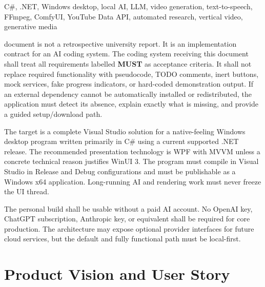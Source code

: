 \documentclass[10pt,journal,compsoc]{IEEEtran}
\begin{document}
{\begin{IEEEkeywords}
C\#, .NET, Windows desktop, local AI, LLM, video generation, text-to-speech, FFmpeg, ComfyUI, YouTube Data API, automated research, vertical video, generative media
\end{IEEEkeywords}}

\maketitle
\IEEEdisplaynontitleabstractindextext
\IEEEpeerreviewmaketitle


 document is not a retrospective university report. It is an implementation contract for an AI coding system. The coding system receiving this document shall treat all requirements labelled \textbf{MUST} as acceptance criteria. It shall not replace required functionality with pseudocode, TODO comments, inert buttons, mock services, fake progress indicators, or hard-coded demonstration output. If an external dependency cannot be automatically installed or redistributed, the application must detect its absence, explain exactly what is missing, and provide a guided setup/download path.

The target is a complete Visual Studio solution for a native-feeling Windows desktop program written primarily in C\# using a current supported .NET release. The recommended presentation technology is WPF with MVVM unless a concrete technical reason justifies WinUI 3. The program must compile in Visual Studio in Release and Debug configurations and must be publishable as a Windows x64 application. Long-running AI and rendering work must never freeze the UI thread.

The personal build shall be usable without a paid AI account. No OpenAI key, ChatGPT subscription, Anthropic key, or equivalent shall be required for core production. The architecture may expose optional provider interfaces for future cloud services, but the default and fully functional path must be local-first.

\section{Product Vision and User Story}
\end{document}
